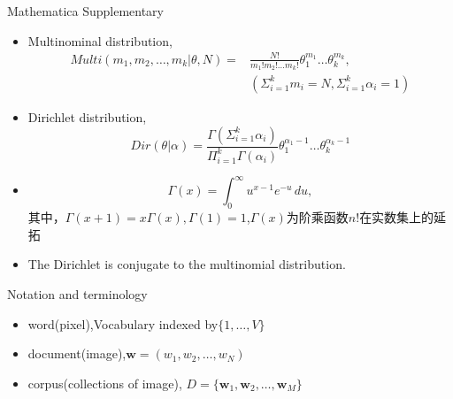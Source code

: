 \documentclass{beamer}
\begin{document}
\begin{frame}{Mathematica Supplementary}
    \begin{itemize}
        \item {
                Multinominal distribution, 
           \begin{equation}
               \begin{split}
                Multi(m_1,m_2,\ldots,m_k|\theta, N)=&
                \frac{N!}{m_1!m_2! \ldots m_k!}  \theta_1^{m_1} \ldots \theta_k^{m_k} , \\
                & (\Sigma _{i=1}^k m_i=N,  \Sigma _{i=1}^k \alpha _i=1)
                \end{split} 
           \end{equation}
            }
        \item {
                Dirichlet distribution,
            \begin{equation}
                 Dir( \theta | \alpha )=
                \frac{ \Gamma ( \Sigma _{i=1}^k  \alpha _i)}{ \Pi _{i=1}^k \Gamma (\alpha_i)}
                \theta _1^{\alpha_1-1} \ldots \theta _k^{\alpha_k-1}
            \end{equation}
            }
        \item  {
                \begin{equation}
                 \Gamma (x) = \int_{0}^{ \infty } u^{x-1}e^{-u} \, du,
                \end{equation}
        }
        其中，$\Gamma (x+1) = x \Gamma (x), \Gamma(1) = 1$,$\Gamma(x)$为阶乘函数$n!$在实数集上的延拓
        \item {
        The Dirichlet is conjugate to the multinomial distribution.
        }
    \end{itemize}
\end{frame}


\begin{frame}{Notation and  terminology}
    \begin{itemize}
        \item word(pixel),Vocabulary indexed by$\{1,\ldots,V\}$
        \item document(image),$\textbf{w} = (w_1,w_2,\ldots, w_N)$
        \item corpus(collections of image), $D = \{ \textbf{w}_1, \textbf{w}_2, \ldots, \textbf{w}_M \}$
    \end{itemize}
\end{frame}
\end{document}
